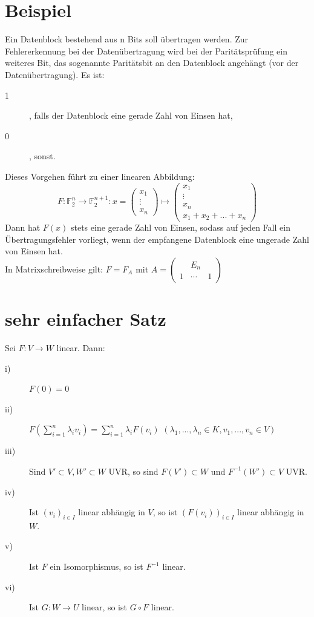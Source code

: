 \documentclass{scrbook}
\begin{document}
\section{Beispiel}
Ein Datenblock bestehend aus n Bits soll übertragen werden. Zur Fehlererkennung bei der Datenübertragung wird bei der Paritätsprüfung ein weiteres Bit, das sogenannte Paritätsbit an den Datenblock angehängt (vor der Datenübertragung). Es ist:
\begin{description}
\item[1], falls der Datenblock eine gerade Zahl von Einsen hat,
\item[0], sonst.
\end{description}
Dieses Vorgehen führt zu einer linearen Abbildung:
\[F: \mathbb{F}_2^n\rightarrow \mathbb{F}_2^{n+1}: x = \left(\begin{array}{c}
x_1\\\vdots\\x_n
\end{array}\right) \mapsto\left(
\begin{array}{c}
x_1\\\vdots\\x_n\\x_1+x_2+...+x_n
\end{array}
\right)\]
Dann hat $F(x)$ stets eine gerade Zahl von Einsen, sodass auf jeden Fall ein Übertragungsfehler vorliegt, wenn der empfangene Datenblock eine ungerade Zahl von Einsen hat.\\ In Matrixschreibweise gilt: $F=F_A$ mit $A=\left(
\begin{array}{ccc}
&E_n\\
1&\cdots&1
\end{array}
\right)$
\section{sehr einfacher Satz}
Sei $F:V \rightarrow W$ linear. Dann:
\begin{description}
\item[i)] $F(0) = 0$
\item[ii)] $F(\sum^n_{i=1} \lambda_i v_i) = \sum^n_{i=1}\lambda_iF(v_i)$ $(\lambda_1,...,\lambda_n \in K, v_1,...,v_n \in V)$
\item[iii)] Sind $V' \subset V, W'\subset W$ UVR, so sind $F(V') \subset W$ und $F^{-1}(W')\subset V$ UVR.
\item[iv)] Ist $(v_i)_{i\in I}$ linear abhängig in $V$, so ist $(F(v_i))_{i\in I}$ linear abhängig in $W$.
\item[v)] Ist $F$ ein Isomorphismus, so ist $F^{-1}$ linear.
\item[vi)] Ist $G: W \rightarrow U$ linear, so ist $G \circ F$ linear.
\end{description}
\end{document}
